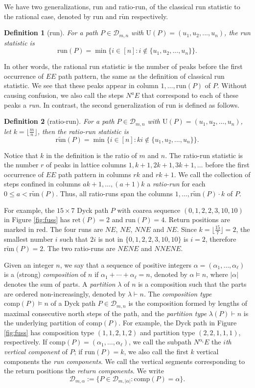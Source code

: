 \documentclass[11pt,a4paper,reqno]{article}
\newtheorem*{dfn}{Definition}
\newcommand{\fref}[1]{Figure \ref{fig:#1}}
\newcommand{\DD}{\mathcal{D}}
\newcommand{\run}{\mathrm{run}}
\newcommand{\runb}{\widetilde{{\mathrm{run}}}}
\newcommand{\U}{\mathrm{U}}
\newcommand{\ret}{\mathrm{ret}}
\newcommand{\al}{\alpha}
\newcommand{\la}{\lambda}
\newcommand{\comp}{\mathrm{comp}}
\newcommand{\LiLan}{}
\begin{document}
{	We have two generalizations, run and ratio-run, of the classical run statistic to the rational case, denoted by run and $\runb$ respectively. 
	\begin{dfn}[run]
		For a path $P\in\DD_{m,n}$ with $\U(P)=(u_1,u_2,...,u_n)$, the run statistic is 
		$$\run(P)=\min\{i\in[n]:i\notin\{u_1,u_2,...,u_n\}\}.$$
	\end{dfn}
	In other words, the rational run statistic is the number of peaks before the first occurrence of $EE$ path pattern, the same as the definition of classical run statistic.  We see that these peaks appear in column $1,\ldots,\run(P)$ of $P$. 
Without causing confusion, we also call the steps $N^aE$ that correspond to each of these peaks a \textit{run}. In contrast, the second generalization of $\run$ is defined as follows.
	\begin{dfn}[ratio-run]
		For a path $P\in\DD_{m,n}$ with $\U(P)=(u_1,u_2,...,u_n)$, let $k=\lfloor \frac{m}{n} \rfloor$, then the ratio-run statistic is 
		$$\runb(P)=\min\{i\in[n]:ki\notin\{u_1,u_2,...,u_n\}\}.$$
	\end{dfn}
	Notice that $k$ in the definition is the ratio of $m$ and $n$. 
    The ratio-run statistic is the number $r$ of peaks in lattice columns $1,k+1,2k+1,3k+1,\ldots$ before the first occurrence of $EE$ path pattern in columns $rk$ and $rk+1$. We call the collection of steps confined in columns $ak+1,\ldots,(a+1)k$ a \textit{ratio-run} for each $0\leq a<\runb(P)$. {\LiLan Thus,} all ratio-runs span the columns $1,\ldots,\runb(P)\cdot k$ of $P$.
    
    
	
	
	For example, the $15\times 7$ Dyck path $P$ with coarea sequence $(0,1,2,2,3,10,10)$ in \fref{fuss} has $\ret(P)=2$ and $\run(P)=4$. Return positions are marked in red. The four runs are $NE$, $NE$, $NNE$ and $NE$.
	Since $k=\lfloor \frac{15}{7} \rfloor = 2$, the smallest number $i$ such that $2i$ is not in $\{0,1,2,2,3,10,10\}$ is
	$i=2$, therefore $\runb(P)=2$. The two ratio-runs are $NENE$ and $NNENE$.
	
	
	Given an integer $n$, {\LiLan we say that a sequence of positive integers $\al=(\al_1,\ldots,\al_{\ell})$ is a (strong) \textit{composition} of $n$ if $\al_1+\cdots+\al_{\ell}=n$, denoted by $\al\vDash n$, where $|\al|$ denotes the sum of parts}. A \textit{partition} $\la$ of $n$ is a composition such that the parts are ordered non-increasingly, denoted by $\la\vdash n$. The \textit{composition type} $\comp(P) \vDash n$ of a Dyck path $P \in \DD_{m,n}$ is the composition formed by lengths of maximal consecutive north steps of the path, and the \textit{partition type} $\la(P) \vdash n$ is the underlying partition of $\comp(P)$. 
	For example, the Dyck path in \fref{fuss} has composition type $(1,1,2,1,2)$ and  partition type $(2,2,1,1,1)$, respectively. If $\comp(P)=(\al_1,\ldots,\al_\ell)$, we call the subpath $N^{\al_i}E$ the \textit{$i$th vertical component} of $P$; if $\run(P)=k$, we also call the first $k$ vertical components the \textit{run components}. We call the vertical segments corresponding to the return positions the \textit{return components}. We write
	$$\DD_{m,\al}:=\{P\in \DD_{m,|\al|}:\comp(P) = \al\}.$$
	


}
\end{document}
